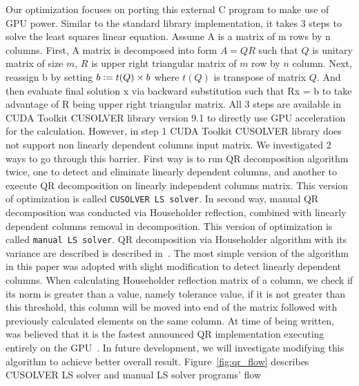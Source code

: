 \documentclass[English]{dicomopapers}
\begin{document}
Our optimization focuses on porting this external C program to make use of GPU power. Similar to the standard library implementation, it takes 3 steps to solve the least squares linear equation. Assume A is a matrix of m rows by n columns. First, A matrix is decomposed into form \(A = QR\) such that \(Q\) is unitary matrix of size \(m\), \(R\) is upper right triangular matrix of \(m\) row by \(n\) column. Next, reassign b by setting \(b \vcentcolon= t(Q) \times b\) where \(t(Q)\) is transpose of matrix \(Q\). And then evaluate final solution x via backward substitution such that Rx = b to take advantage of R being upper right triangular matrix. All 3 steps are available in CUDA Toolkit CUSOLVER library version 9.1 to directly use GPU acceleration for the calculation. However, in step 1 CUDA Toolkit CUSOLVER library does not support non linearly dependent columns input matrix. We investigated 2 ways to go through this barrier. First way is to run QR decomposition algorithm twice, one to detect and eliminate linearly dependent columns, and another to execute QR decomposition on linearly independent columns matrix. This version of optimization is called \texttt{CUSOLVER LS solver}. In second way, manual QR decomposition was conducted via Householder reflection, combined with linearly dependent columns removal in decomposition. This version of optimization is called \texttt{manual LS solver}. QR decomposition via Householder algorithm with its variance are described is described in~\cite{Kerr:2009:QDG:1513895.1513904}. The most simple version of the algorithm in this paper was adopted with slight modification to detect linearly dependent columns. When calculating Householder reflection matrix of a column, we check if its norm is greater than a value, namely tolerance value, if it is not greater than this threshold, this column will be moved into end of the matrix followed with previously calculated elements on the same column. At time of being written,~\cite{Kerr:2009:QDG:1513895.1513904} was believed that it is the fastest announced QR implementation executing entirely on the GPU~\cite{Kerr:2009:QDG:1513895.1513904}. In future development, we will investigate modifying this algorithm to achieve better overall result.\newline
 Figure~\ref{fig:qr_flow} describes CUSOLVER LS solver and manual LS solver programs' flow\newline
\end{document}
